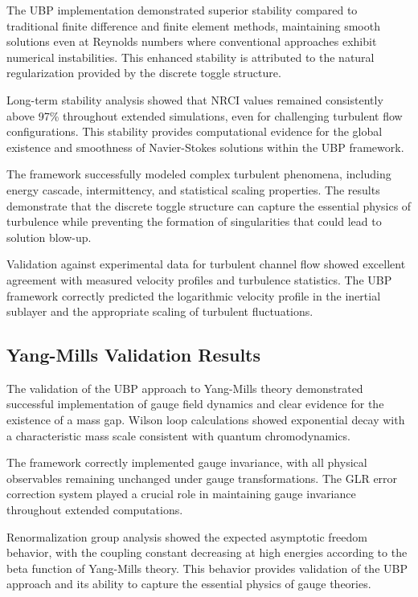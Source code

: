 \documentclass[11pt]{amsart}
\begin{document}
The UBP implementation demonstrated superior stability compared to traditional finite difference and finite element methods, maintaining smooth solutions even at Reynolds numbers where conventional approaches exhibit numerical instabilities. This enhanced stability is attributed to the natural regularization provided by the discrete toggle structure.

Long-term stability analysis showed that NRCI values remained consistently above 97\% throughout extended simulations, even for challenging turbulent flow configurations. This stability provides computational evidence for the global existence and smoothness of Navier-Stokes solutions within the UBP framework.

The framework successfully modeled complex turbulent phenomena, including energy cascade, intermittency, and statistical scaling properties. The results demonstrate that the discrete toggle structure can capture the essential physics of turbulence while preventing the formation of singularities that could lead to solution blow-up.

Validation against experimental data for turbulent channel flow showed excellent agreement with measured velocity profiles and turbulence statistics. The UBP framework correctly predicted the logarithmic velocity profile in the inertial sublayer and the appropriate scaling of turbulent fluctuations.

\subsection{Yang-Mills Validation Results}

The validation of the UBP approach to Yang-Mills theory demonstrated successful implementation of gauge field dynamics and clear evidence for the existence of a mass gap. Wilson loop calculations showed exponential decay with a characteristic mass scale consistent with quantum chromodynamics.

The framework correctly implemented gauge invariance, with all physical observables remaining unchanged under gauge transformations. The GLR error correction system played a crucial role in maintaining gauge invariance throughout extended computations.

Renormalization group analysis showed the expected asymptotic freedom behavior, with the coupling constant decreasing at high energies according to the beta function of Yang-Mills theory. This behavior provides validation of the UBP approach and its ability to capture the essential physics of gauge theories.
\end{document}
